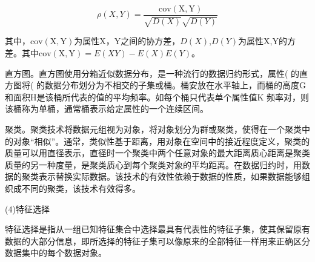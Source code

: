 \begin{equation}
\rho(X,Y)=\frac{\mathrm{cov(X,Y)}}{\sqrt{D(X)}\sqrt{D(Y)}}
\end{equation}

其中，$\mathrm{cov(X,Y)}$为属性X，Y之间的协方差，$D(X)$,$D(Y)$为属性X,Y的方差。其中$\mathrm{cov(X,Y)}=E(XY)-E(X)E(Y)$。

直方图。直方图使用分箱近似数据分布，是一种流行的数据归约形式，属性( 的直方图将( 的数据分布划分为不相交的子集或桶。桶安放在水平轴上，而桶的高度G和面积H是该桶所代表的值的平均频率。如每个桶只代表单个属性值K 频率对，则该桶称为单桶，通常桶表示给定属性的一个连续区间。

聚类。聚类技术将数据元组视为对象，将对象划分为群或聚类，使得在一个聚类中的对象“相似”。通常，类似性基于距离，用对象在空间中的接近程度定义，聚类的质量可以用直径表示，直径时一个聚类中两个任意对象的最大距离质心距离是聚类质量的另一种度量，是聚类质心到每个聚类对象的平均距离。在数据归约时，用数据的聚类表示替换实际数据。该技术的有效性依赖于数据的性质，如果数据能够组织成不同的聚类，该技术有效得多。

(4)特征选择

特征选择是指从一组已知特征集合中选择最具有代表性的特征子集，使其保留原有数据的大部分信息，即所选择的特征子集可以像原来的全部特征一样用来正确区分数据集中的每个数据对象。

